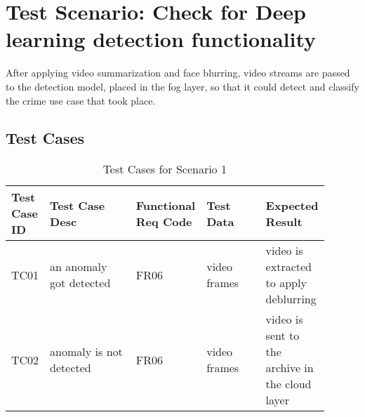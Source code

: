 \documentclass[12pt]{article}
\begin{document}
\section{Test Scenario: Check for Deep learning detection functionality}\label{sec:TSy}
After applying video summarization and face blurring, video streams are passed to the detection model, placed in the fog layer, so that it could detect and classify the crime use case that took place. 
\subsection{Test Cases}
\begin{table}[h]
\caption{Test Cases for Scenario 1}
\label{tab:TC1}
\begin{tabular}{|p{0.1\linewidth}|p{0.3\linewidth}|p{0.1\linewidth}|p{0.2\linewidth}|p{0.2\linewidth}|}
\hline
Test Case ID & Test Case Desc & Functional Req Code & Test Data & Expected Result \\ \hline
TC01  & an anomaly got detected & FR06 &  video frames   & video is extracted to apply deblurring                \\ \hline
TC02 & anomaly is not detected   & FR06    &  video frames      &  video is sent to the archive in the cloud layer         \\ \hline

\end{tabular}
\end{table}
\end{document}
